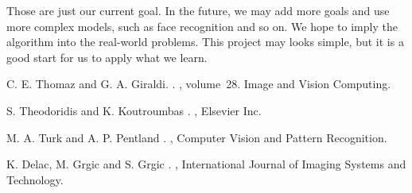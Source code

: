 \documentclass[11pt]{article}
\begin{document}
Those are just our current goal. In the future, we may add more goals and use more complex models, such as face recognition and so on. We hope to imply the algorithm into the real-world problems. This project may looks simple, but it is a good start for us to apply what we learn.

\begin{thebibliography}{}

C. E. Thomaz and G. A. Giraldi.
.
, volume~28.
\newblock Image and Vision Computing.

S. Theodoridis and K. Koutroumbas
.
, 
\newblock Elsevier Inc.

M. A. Turk and A. P. Pentland
.
, 
\newblock Computer Vision and Pattern Recognition.

K. Delac, M. Grgic and S. Grgic
.
, 
\newblock International Journal of Imaging Systems and Technology.

\end{thebibliography}
\end{document}
